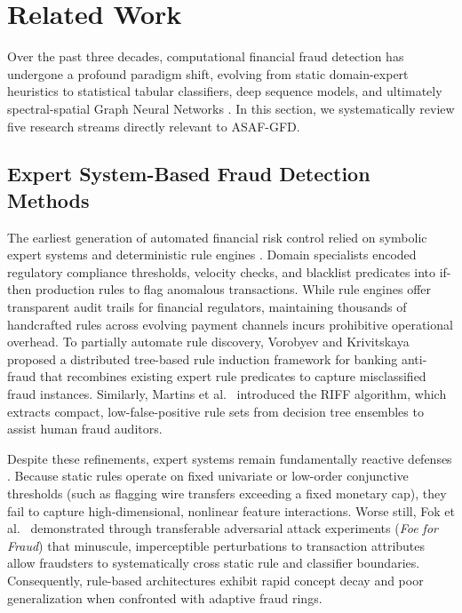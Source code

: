 \documentclass[10pt,a4paper,twocolumn]{article}
\begin{document}
\section{Related Work}

Over the past three decades, computational financial fraud detection has undergone a profound paradigm shift, evolving from static domain-expert heuristics to statistical tabular classifiers, deep sequence models, and ultimately spectral-spatial Graph Neural Networks \cite{ref1,ref2,ref3}. In this section, we systematically review five research streams directly relevant to ASAF-GFD.

\subsection{Expert System-Based Fraud Detection Methods}

The earliest generation of automated financial risk control relied on symbolic expert systems and deterministic rule engines \cite{ref4,ref14}. Domain specialists encoded regulatory compliance thresholds, velocity checks, and blacklist predicates into if-then production rules to flag anomalous transactions. While rule engines offer transparent audit trails for financial regulators, maintaining thousands of handcrafted rules across evolving payment channels incurs prohibitive operational overhead. To partially automate rule discovery, Vorobyev and Krivitskaya \cite{ref15} proposed a distributed tree-based rule induction framework for banking anti-fraud that recombines existing expert rule predicates to capture misclassified fraud instances. Similarly, Martins et al.\ \cite{ref16} introduced the RIFF algorithm, which extracts compact, low-false-positive rule sets from decision tree ensembles to assist human fraud auditors.

Despite these refinements, expert systems remain fundamentally reactive defenses \cite{ref17}. Because static rules operate on fixed univariate or low-order conjunctive thresholds (such as flagging wire transfers exceeding a fixed monetary cap), they fail to capture high-dimensional, nonlinear feature interactions. Worse still, Fok et al.\ \cite{ref18} demonstrated through transferable adversarial attack experiments (\textit{Foe for Fraud}) that minuscule, imperceptible perturbations to transaction attributes allow fraudsters to systematically cross static rule and classifier boundaries. Consequently, rule-based architectures exhibit rapid concept decay and poor generalization when confronted with adaptive fraud rings.
\end{document}
